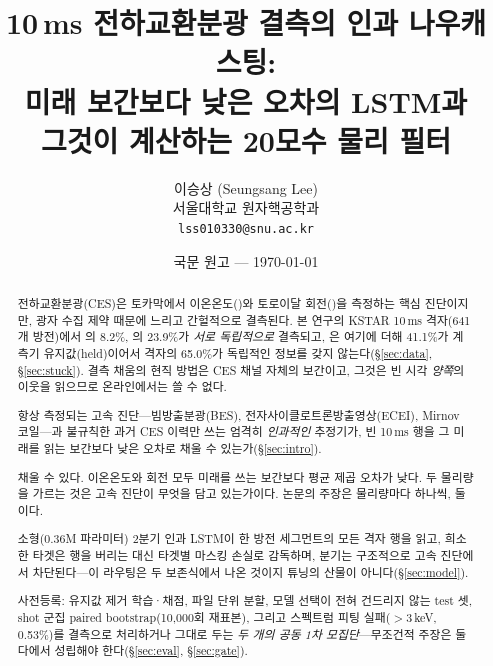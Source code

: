\documentclass[10pt,a4paper]{article}
\title{\bfseries 10\,ms 전하교환분광 결측의 인과 나우캐스팅:\\[2pt]
\large 미래 보간보다 낮은 오차의 LSTM과\\
그것이 계산하는 20모수 물리 필터}
\author{이승상 (Seungsang Lee)\\
서울대학교 원자핵공학과\\
\texttt{lss010330@snu.ac.kr}}
\date{국문 원고 --- \today}
\begin{document}
\maketitle

\begin{abstract}
\begin{fielddesc}[5.4em]

\item[배경] 전하교환분광(CES)은 토카막에서 이온온도(\Ti)와 토로이달 회전(\Vrot)을
측정하는 핵심 진단이지만, 광자 수집 제약 때문에 느리고 간헐적으로 결측된다. 본
연구의 KSTAR 10\,ms 격자(641개 방전)에서 \Ti{}의 8.2\%, \Vrot{}의 23.9\%가
\emph{서로 독립적으로} 결측되고, \Vrot{}은 여기에 더해 41.1\%가 계측기
유지값(held)이어서 격자의 65.0\%가 독립적인 \Vrot{} 정보를 갖지 않는다(\S\ref{sec:data},
\S\ref{sec:stuck}). 결측 채움의 현직 방법은 CES 채널 자체의 보간이고, 그것은 빈 시각
\emph{양쪽}의 이웃을 읽으므로 온라인에서는 쓸 수 없다.

\item[질문] 항상 측정되는 고속 진단---빔방출분광(BES), 전자사이클로트론방출영상(ECEI),
Mirnov 코일---과 불규칙한 과거 CES 이력만 쓰는 엄격히 \emph{인과적인} 추정기가,
빈 10\,ms 행을 그 미래를 읽는 보간보다 낮은 오차로 채울 수 있는가(\S\ref{sec:intro}).

\item[답] 채울 수 있다. 이온온도와 회전 모두 미래를 쓰는 보간보다 평균 제곱 오차가
낮다. 두 물리량을 가르는 것은 고속 진단이 무엇을 담고 있는가이다. 논문의 주장은
물리량마다 하나씩, 둘이다.

\item[설계] 소형(0.36M 파라미터) 2분기 인과 LSTM이 한 방전 세그먼트의 모든 격자 행을
읽고, 희소한 타겟은 행을 버리는 대신 타겟별 마스킹 손실로 감독하며, \Vrot{} 분기는
구조적으로 고속 진단에서 차단된다---이 라우팅은 두 보존식에서 나온 것이지 튜닝의
산물이 아니다(\S\ref{sec:model}).

\item[프로토콜] 사전등록: 유지값 제거 학습·채점, 파일 단위 분할, 모델 선택이 전혀
건드리지 않는 test 셋, shot 군집 paired bootstrap(10{,}000회 재표본), 그리고 \Ti{}
스펙트럼 피팅 실패($>$3\,keV, 0.53\%)를 결측으로 처리하거나 그대로 두는 \emph{두 개의
공동 1차 모집단}---무조건적 주장은 둘 다에서 성립해야 한다(\S\ref{sec:eval},
\S\ref{sec:gate}).


\end{fielddesc}
\end{abstract}
\end{document}
